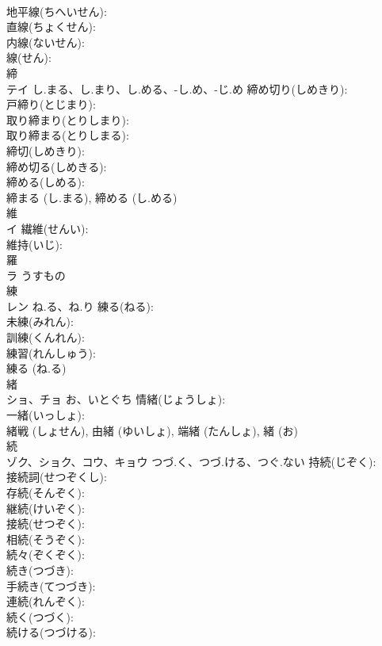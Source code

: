 \documentclass[8pt]{extreport}
\begin{document}
\begin{CJK}{UTF8}{min}
\\	地平線(ちへいせん): 
\\	直線(ちょくせん): 
\\	内線(ないせん): 
\\	線(せん): 
\\	締			
\\	テイ	し.まる、し.まり、し.める、-し.め、-じ.め	締め切り(しめきり): 
\\	戸締り(とじまり): 
\\	取り締まり(とりしまり): 
\\	取り締まる(とりしまる): 
\\	締切(しめきり): 
\\	締め切る(しめきる): 
\\	締める(しめる): 
\\	締まる (し.まる), 締める (し.める)
\\	維			
\\	イ		繊維(せんい): 
\\	維持(いじ): 
\\	羅			
\\	ラ	うすもの		
\\	練			
\\	レン	ね.る、ね.り	練る(ねる): 
\\	未練(みれん): 
\\	訓練(くんれん): 
\\	練習(れんしゅう): 
\\	練る (ね.る)
\\	緒			
\\	ショ、チョ	お、いとぐち	情緒(じょうしょ): 
\\	一緒(いっしょ): 
\\	緒戦 (しょせん), 由緒 (ゆいしょ), 端緒 (たんしょ), 緒 (お)
\\	続			
\\	ゾク、ショク、コウ、キョウ	つづ.く、つづ.ける、つぐ.ない	持続(じぞく): 
\\	接続詞(せつぞくし): 
\\	存続(そんぞく): 
\\	継続(けいぞく): 
\\	接続(せつぞく): 
\\	相続(そうぞく): 
\\	続々(ぞくぞく): 
\\	続き(つづき): 
\\	手続き(てつづき): 
\\	連続(れんぞく): 
\\	続く(つづく): 
\\	続ける(つづける): 

\end{CJK}
\end{document}
